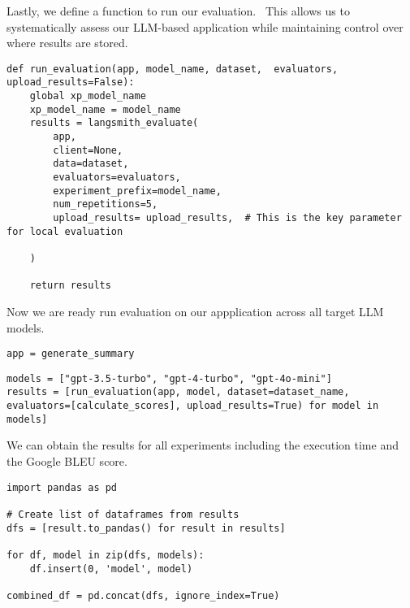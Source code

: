 Lastly, we define a function to run our evaluation.~ This allows us to systematically assess our LLM-based application while maintaining control over where results are stored.

\begin{verbatim}
def run_evaluation(app, model_name, dataset,  evaluators, upload_results=False):
    global xp_model_name
    xp_model_name = model_name
    results = langsmith_evaluate(
        app,
        client=None,
        data=dataset,
        evaluators=evaluators,
        experiment_prefix=model_name,
        num_repetitions=5,
        upload_results= upload_results,  # This is the key parameter for local evaluation

    )
    
    return results
\end{verbatim}
Now we are ready run evaluation on our appplication across all target LLM models.

\begin{verbatim}
app = generate_summary
\end{verbatim}

\begin{verbatim}
models = ["gpt-3.5-turbo", "gpt-4-turbo", "gpt-4o-mini"]
results = [run_evaluation(app, model, dataset=dataset_name, evaluators=[calculate_scores], upload_results=True) for model in models]
\end{verbatim}

We can obtain the results for all experiments including the execution time and the Google BLEU score.

\begin{verbatim}
import pandas as pd

# Create list of dataframes from results
dfs = [result.to_pandas() for result in results]

for df, model in zip(dfs, models):
    df.insert(0, 'model', model)

combined_df = pd.concat(dfs, ignore_index=True)
\end{verbatim}




